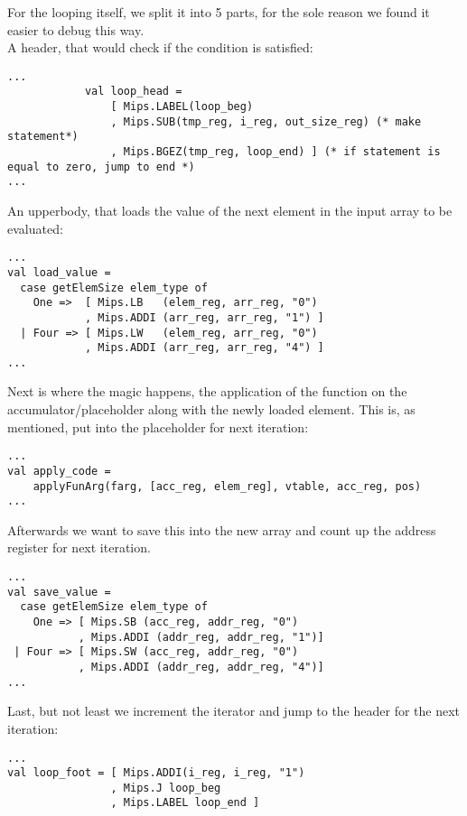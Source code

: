 \documentclass[paper=a4, fontsize=11pt]{scrartcl} %
\numberwithin{equation}{section} %
\numberwithin{figure}{section} %
\numberwithin{table}{section} %
\begin{document}
For the looping itself, we split it into 5 parts, for the sole reason we found it easier to debug this way.\\
A header, that would check if the condition is satisfied:\\
\begin{lstlisting}
...
            val loop_head =
                [ Mips.LABEL(loop_beg) 
                , Mips.SUB(tmp_reg, i_reg, out_size_reg) (* make statement*)
                , Mips.BGEZ(tmp_reg, loop_end) ] (* if statement is equal to zero, jump to end *)
...
\end{lstlisting}	

An upperbody, that loads the value of the next element in the input array to be evaluated:\\
\begin{lstlisting}
...
val load_value =
  case getElemSize elem_type of
    One =>  [ Mips.LB   (elem_reg, arr_reg, "0")
            , Mips.ADDI (arr_reg, arr_reg, "1") ]
  | Four => [ Mips.LW   (elem_reg, arr_reg, "0")
            , Mips.ADDI (arr_reg, arr_reg, "4") ]
...
\end{lstlisting}

Next is where the magic happens, the application of the function on the accumulator/placeholder along with the newly loaded element. This is, as mentioned, put into the placeholder for next iteration:\\
\begin{lstlisting}
...
val apply_code =
    applyFunArg(farg, [acc_reg, elem_reg], vtable, acc_reg, pos)
...
\end{lstlisting}

Afterwards we want to save this into the new array and count up the address register for next iteration.
\begin{lstlisting}
...
val save_value =
  case getElemSize elem_type of
    One => [ Mips.SB (acc_reg, addr_reg, "0")
           , Mips.ADDI (addr_reg, addr_reg, "1")] 
 | Four => [ Mips.SW (acc_reg, addr_reg, "0") 
           , Mips.ADDI (addr_reg, addr_reg, "4")]
...
\end{lstlisting}

Last, but not least we increment the iterator and jump to the header for the next iteration:\\
\begin{lstlisting}
...
val loop_foot = [ Mips.ADDI(i_reg, i_reg, "1")
                , Mips.J loop_beg
                , Mips.LABEL loop_end ]
\end{lstlisting}
\end{document}
